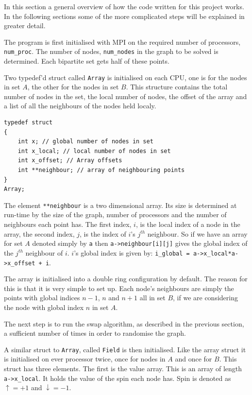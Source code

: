 \documentclass[pdftex,12pt,a4paper]{article}
\begin{document}
In this section a general overview of how the code written for this project works. In the following sections some of the more complicated steps will be explained in greater detail.

The program is first initialised with MPI on the required number of processors, \verb|num_proc|. The number of nodes, \verb|num_nodes| in the graph to be solved is determined. Each bipartite set gets half of these points.

Two typedef'd struct called \verb|Array| is initialised on each CPU, one is for the nodes in set $A$, the other for the nodes in set $B$. This structure contains the total number of nodes in the set, the local number of nodes, the offset of the array and a list of all the neighbours of the nodes held localy.

\begin{lstlisting}
typedef struct
{
	int x; // global number of nodes in set
	int x_local; // local number of nodes in set
	int x_offset; // Array offsets
	int **neighbour; // array of neighbouring points
}
Array;
\end{lstlisting}

The element \verb|**neighbour| is a two dimensional array. Its size is determined at run-time by the size of the graph, number of processors and the number of neighbours each point has. The first index, $i$, is the local index of a node in the array, the second index, $j$, is the index of $i$'s $j^{th}$ neighbour. So if we have an array for set $A$ denoted simply by \verb|a| then \verb|a->neighbour[i][j]| gives the global index of the $j^{th}$ neighbour of $i$. $i$'s global index is given by: \verb|i_global = a->x_local*a->x_offset + i|.

The array is initialised into a double ring configuration by default. The reason for this is that it is very simple to set up. Each node's neighbours are simply the points with global indices $n-1$, $n$ and $n+1$ all in set $B$, if we are considering the node with global index $n$ in set $A$.


The next step is to run the swap algorithm, as described in the previous section, a sufficient number of times in order to randomise the graph.

A similar struct to \verb|Array|, called \verb|Field| is then initialised. Like the array struct it is initialised on ever processor twice, once for nodes in $A$ and once for $B$. This struct has three elements. The first is the value array. This is an array of length \verb|a->x_local|. It holds the value of the spin each node has. Spin is denoted as $\uparrow = +1$ and $\downarrow = -1$.
\end{document}
